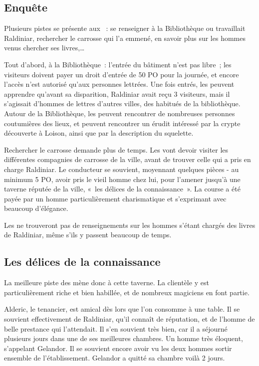 \documentclass[a4paper,10pt,openany]{book}
\begin{document}
\begin{multicols}{2}
\subsection{Enquête}
Plusieurs pistes se présente aux \PJs : se renseigner à la Bibliothèque ou travaillait Raldiniar, rechercher le carrosse qui l’a emmené, en savoir
plus sur les hommes venus chercher ses livres,\ldots\par Tout d’abord, à la Bibliothèque : l’entrée du bâtiment n’est pas libre ; les visiteurs
doivent payer un droit d'entrée de 50 PO pour la journée, et encore l’accès n’est autorisé qu’aux personnes lettrées. Une fois entrés, les \PJs
peuvent apprendre qu’avant sa disparition, Raldiniar avait reçu 3 visiteurs, mais il s’agissait d’hommes de lettres d’autres villes, des habitués de
la bibliothèque. Autour de la Bibliothèque, les \PJs peuvent rencontrer de nombreuses personnes coutumières des lieux, et peuvent rencontrer un érudit
intéressé par la crypte découverte à Loison, ainsi que par la description du squelette.\par Rechercher le carrosse demande plus de temps. Les \PJs
vont devoir visiter les différentes compagnies de carrosse de la ville, avant de trouver celle qui a pris en charge Raldiniar. Le conducteur se
souvient, moyennant quelques pièces - au minimum 5 PO, avoir pris le vieil homme chez lui, pour l’amener jusqu’à une taverne réputée de la ville,
« les délices de la connaissance ». La course a été payée par un homme particulièrement charismatique et s’exprimant avec beaucoup d’élégance.\par
Les \PJs ne trouveront pas de renseignements sur les hommes s’étant chargés des livres de Raldiniar, même s’ils y passent beaucoup de temps.

\subsection{Les délices de la connaissance}
La meilleure piste des \PJs mène donc à cette taverne. La clientèle y est particulièrement riche et bien habillée, et de nombreux magiciens en font
partie.\par Alderic, le tenancier, est amical dès lors que l’on consomme à une table. Il se souvient effectivement de Raldiniar, qu’il connaît de
réputation, et de l’homme de belle prestance qui l’attendait. Il s’en souvient très bien, car il a séjourné plusieurs jours dans une de ses meilleures
chambres. Un homme très éloquent, s’appelant Gelandor. Il se souvient encore avoir vu les deux hommes sortir ensemble de l’établissement. Gelandor a
quitté sa chambre voilà 2 jours.


\end{multicols}
\end{document}
